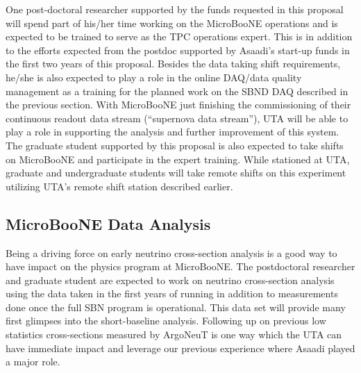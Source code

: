 One post-doctoral researcher supported by the funds requested in this proposal will spend part of his/her time working on the MicroBooNE operations and is expected to be trained to serve as the TPC operations expert. This is in addition to the efforts expected from the postdoc supported by Asaadi's start-up funds in the first two years of this proposal.  Besides the data taking shift requirements, he/she is also expected to play a role in the online DAQ/data quality management as a training for the planned work on the SBND DAQ described in the previous section. With MicroBooNE just finishing the commissioning of their continuous readout data stream (``supernova data stream''), UTA will be able to play a role in supporting the analysis and further improvement of this system. The graduate student supported by this proposal is also expected to take shifts on MicroBooNE and participate in the expert training. While stationed at UTA, graduate and undergraduate students will take remote shifts on this experiment utilizing UTA's remote shift station described earlier. 


\subsection{MicroBooNE Data Analysis}\label{sec:UbooneDataAnalysis}
Being a driving force on early neutrino cross-section analysis is a good way to have impact on the physics program at MicroBooNE. The postdoctoral researcher and graduate student are expected to work on neutrino cross-section analysis using the data taken in the first years of running in addition to measurements done once the full SBN program is operational. This data set will provide many first glimpses into the short-baseline analysis. Following up on previous low statistics cross-sections measured by ArgoNeuT is one way which the UTA can have immediate impact and leverage our previous experience where Asaadi played a major role. 

